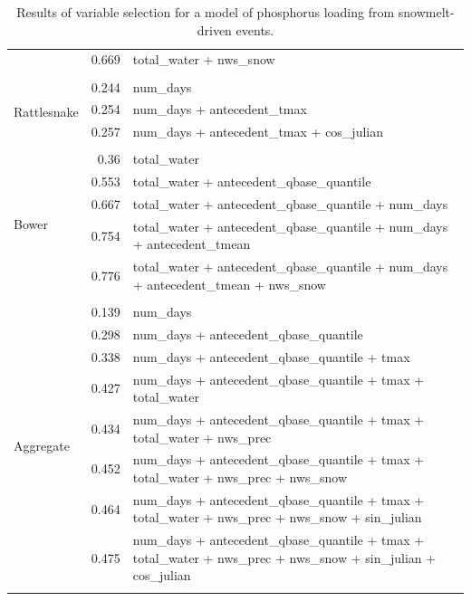 \documentclass[10pt]{article}
\begin{document}
\begin{table}[h]
\begin{center}
\begin{tabular}{lrl}
 & 0.669 & total\_water + nws\_snow\\ 
\vspace{2mm}\\ \multirow{4}{*}{Rattlesnake} & 0.244 & num\_days\\ 
 & 0.254 & num\_days + antecedent\_tmax\\ 
 & 0.257 & num\_days + antecedent\_tmax + cos\_julian\\ 
\vspace{2mm}\\ \multirow{6}{*}{Bower} & 0.36 & total\_water\\ 
 & 0.553 & total\_water + antecedent\_qbase\_quantile\\ 
 & 0.667 & total\_water + antecedent\_qbase\_quantile + num\_days\\ 
 & 0.754 & total\_water + antecedent\_qbase\_quantile + num\_days + antecedent\_tmean\\ 
 & 0.776 & total\_water + antecedent\_qbase\_quantile + num\_days + antecedent\_tmean + nws\_snow\\ 
\vspace{2mm}\\ \multirow{9}{*}{Aggregate} & 0.139 & num\_days\\ 
 & 0.298 & num\_days + antecedent\_qbase\_quantile\\ 
 & 0.338 & num\_days + antecedent\_qbase\_quantile + tmax\\ 
 & 0.427 & num\_days + antecedent\_qbase\_quantile + tmax + total\_water\\ 
 & 0.434 & num\_days + antecedent\_qbase\_quantile + tmax + total\_water + nws\_prec\\ 
 & 0.452 & num\_days + antecedent\_qbase\_quantile + tmax + total\_water + nws\_prec + nws\_snow\\ 
 & 0.464 & num\_days + antecedent\_qbase\_quantile + tmax + total\_water + nws\_prec + nws\_snow + sin\_julian\\ 
 & 0.475 & num\_days + antecedent\_qbase\_quantile + tmax + total\_water + nws\_prec + nws\_snow + sin\_julian + cos\_julian\\ 
\vspace{2mm}\\     \end{tabular}
    \caption{Results of variable selection for a model of phosphorus loading from snowmelt-driven events.\label{phos_r_square_snow}}
    \end{center}
\end{table}
\end{document}
